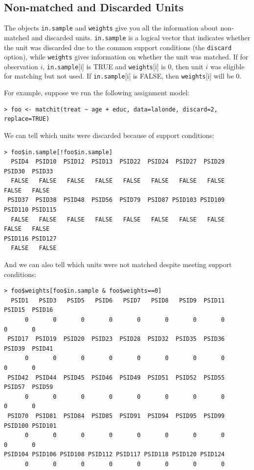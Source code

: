 \documentclass[oneside,letterpaper,titlepage]{article}
\begin{document}
\subsection{Non-matched and Discarded Units}
The objects \texttt{in.sample} and \texttt{weights} give you all the
information about non-matched and discarded units.  \texttt{in.sample}
is a logical vector that indicates whether the unit was discarded due
to the common support conditions (the \texttt{discard} option), while
\texttt{weights} gives information on whether the unit was matched.
If for observation $i$, \texttt{in.sample}[i] is TRUE and
\texttt{weights}[i] is $0$, then unit $i$ was eligible for matching
but not used.  If \texttt{in.sample}[i] is FALSE, then
\texttt{weights}[i] will be $0$.  

For example, suppose we run the following assignment model:

\begin{verbatim}
> foo <- matchit(treat ~ age + educ, data=lalonde, discard=2, replace=TRUE)
\end{verbatim}

We can tell which units were discarded because of support conditions:

\begin{verbatim}
> foo$in.sample[!foo$in.sample]
  PSID4  PSID10  PSID12  PSID13  PSID22  PSID24  PSID27  PSID29  PSID30  PSID33 
  FALSE   FALSE   FALSE   FALSE   FALSE   FALSE   FALSE   FALSE   FALSE   FALSE 
 PSID37  PSID38  PSID48  PSID56  PSID79  PSID87 PSID103 PSID109 PSID110 PSID115 
  FALSE   FALSE   FALSE   FALSE   FALSE   FALSE   FALSE   FALSE   FALSE   FALSE 
PSID116 PSID127 
  FALSE   FALSE 
\end{verbatim}

And we can also tell which units were not matched despite meeting
support conditions:

\begin{verbatim}
> foo$weights[foo$in.sample & foo$weights==0]
  PSID1   PSID3   PSID5   PSID6   PSID7   PSID8   PSID9  PSID11  PSID15  PSID16 
      0       0       0       0       0       0       0       0       0       0 
 PSID17  PSID19  PSID20  PSID23  PSID28  PSID32  PSID35  PSID36  PSID39  PSID41 
      0       0       0       0       0       0       0       0       0       0 
 PSID42  PSID44  PSID45  PSID46  PSID49  PSID51  PSID52  PSID55  PSID57  PSID59 
      0       0       0       0       0       0       0       0       0       0 
 PSID70  PSID81  PSID84  PSID85  PSID91  PSID94  PSID95  PSID99 PSID100 PSID101 
      0       0       0       0       0       0       0       0       0       0 
PSID104 PSID106 PSID108 PSID112 PSID117 PSID118 PSID120 PSID124 
      0       0       0       0       0       0       0       0 
\end{verbatim}
\end{document}

